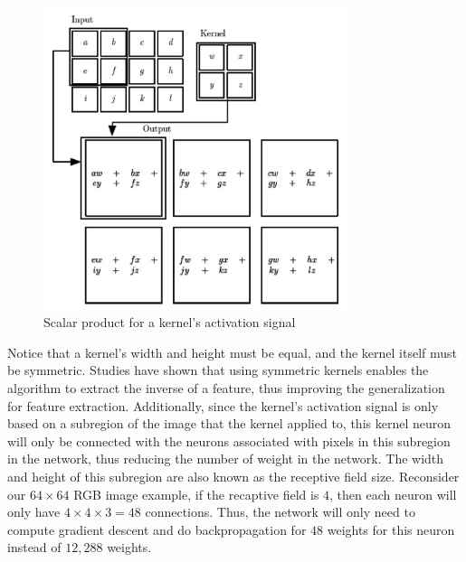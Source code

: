 
\begin{figure}[!ht]
    \centering
    \includegraphics[width=3.5in]{figures/kernel_operation.png}
    \caption{Scalar product for a kernel's activation signal \cite{lecun2015deep}} 
    \label{fig:kernel_op_diagram}
\end{figure}
%
Notice that a kernel's width and height must be equal, and the kernel itself must be symmetric. Studies have shown that using symmetric kernels enables the algorithm to extract the inverse of a feature, thus improving the generalization for feature extraction. Additionally, since the kernel's activation signal is only based on a subregion of the image that the kernel applied to, this kernel neuron will only be connected with the neurons associated with pixels in this subregion in the network, thus reducing the number of weight in the network. The width and height of this subregion are also known as the receptive field size. Reconsider our $64 \times 64$ RGB image example, if the recaptive field is $4$, then each neuron will only have $4 \times 4 \times 3 = 48$ connections. Thus, the network will only need to compute gradient descent and do backpropagation for $48$ weights for this neuron instead of $12,288$ weights.

